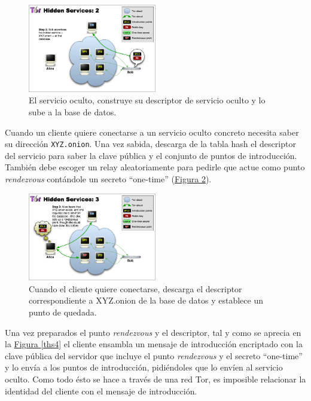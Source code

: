 \documentclass[10pt,a4paper,spanish]{article}
\begin{document}
\begin{figure}[!h]
    \centering
    \includegraphics[width=0.5\textwidth]{THS-2}
    \caption{El servicio oculto, construye su descriptor de servicio oculto y lo sube a la base de datos.}
    \label{ths2}
\end{figure}

Cuando un cliente quiere conectarse a un servicio oculto concreto necesita saber su dirección \texttt{XYZ.onion}. Una vez sabida, descarga de la tabla hash el descriptor del servicio para saber la clave pública y el conjunto de puntos de introducción. También debe escoger un relay aleatoriamente para pedirle que actue como punto \textit{rendezvous} contándole un secreto ``one-time'' (\hyperref[ths3]{Figura \ref*{ths3}}).

\begin{figure}[!h]
    \centering
    \includegraphics[width=0.5\textwidth]{THS-3}
    \caption{Cuando el cliente quiere conectarse, descarga el descriptor correspondiente a XYZ.onion de la base de datos y establece un punto de quedada.}
    \label{ths3}
\end{figure}

Una vez preparados el punto \textit{rendezvous} y el descriptor, tal y como se aprecia en la \hyperref[ths4]{Figura \ref*{ths4}} el cliente ensambla un mensaje de introducción encriptado con la clave pública del servidor que incluye el punto \textit{rendezvous} y el secreto ``one-time'' y lo envía a los puntos de introducción, pidiéndoles que lo envíen al servicio oculto. Como todo ésto se hace a través de una red Tor, es imposible relacionar la identidad del cliente con el mensaje de introducción.
\end{document}
